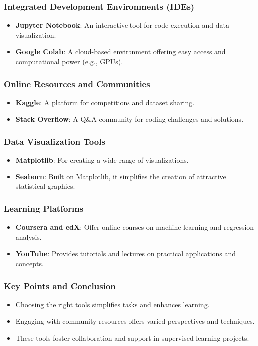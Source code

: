 \documentclass[aspectratio=169]{beamer}
\begin{document}
\begin{frame}
    \frametitle{Integrated Development Environments (IDEs)}
    \begin{itemize}
        \item \textbf{Jupyter Notebook}: An interactive tool for code execution and data visualization.
        \item \textbf{Google Colab}: A cloud-based environment offering easy access and computational power (e.g., GPUs).
    \end{itemize}
\end{frame}

\begin{frame}
    \frametitle{Online Resources and Communities}
    \begin{itemize}
        \item \textbf{Kaggle}: A platform for competitions and dataset sharing.
        \item \textbf{Stack Overflow}: A Q\&A community for coding challenges and solutions.
    \end{itemize}
\end{frame}

\begin{frame}
    \frametitle{Data Visualization Tools}
    \begin{itemize}
        \item \textbf{Matplotlib}: For creating a wide range of visualizations.
        \item \textbf{Seaborn}: Built on Matplotlib, it simplifies the creation of attractive statistical graphics.
    \end{itemize}
\end{frame}

\begin{frame}
    \frametitle{Learning Platforms}
    \begin{itemize}
        \item \textbf{Coursera and edX}: Offer online courses on machine learning and regression analysis.
        \item \textbf{YouTube}: Provides tutorials and lectures on practical applications and concepts.
    \end{itemize}
\end{frame}

\begin{frame}
    \frametitle{Key Points and Conclusion}
    \begin{itemize}
        \item Choosing the right tools simplifies tasks and enhances learning.
        \item Engaging with community resources offers varied perspectives and techniques.
        \item These tools foster collaboration and support in supervised learning projects.
    \end{itemize}
\end{frame}
\end{document}
